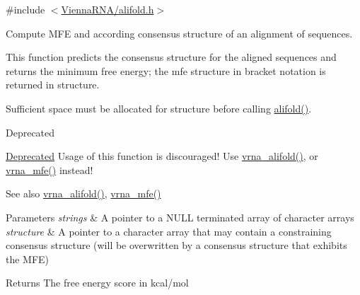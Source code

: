 {\ttfamily \#include $<$\mbox{\hyperlink{alifold_8h}{Vienna\+R\+N\+A/alifold.\+h}}$>$}



Compute M\+FE and according consensus structure of an alignment of sequences. 

This function predicts the consensus structure for the aligned \textquotesingle{}sequences\textquotesingle{} and returns the minimum free energy; the mfe structure in bracket notation is returned in \textquotesingle{}structure\textquotesingle{}.

Sufficient space must be allocated for \textquotesingle{}structure\textquotesingle{} before calling \mbox{\hyperlink{group__mfe__global__deprecated_ga4cf00f0659e5f0480335d69e797f05b1}{alifold()}}.

\begin{DoxyRefDesc}{Deprecated}
\item[\mbox{\hyperlink{deprecated__deprecated000012}{Deprecated}}]Usage of this function is discouraged! Use \mbox{\hyperlink{group__mfe__global_ga6c9d3bef3e92c6d423ffac9f981418c1}{vrna\+\_\+alifold()}}, or \mbox{\hyperlink{group__mfe__global_gabd3b147371ccf25c577f88bbbaf159fd}{vrna\+\_\+mfe()}} instead! \end{DoxyRefDesc}
\begin{DoxySeeAlso}{See also}
\mbox{\hyperlink{group__mfe__global_ga6c9d3bef3e92c6d423ffac9f981418c1}{vrna\+\_\+alifold()}}, \mbox{\hyperlink{group__mfe__global_gabd3b147371ccf25c577f88bbbaf159fd}{vrna\+\_\+mfe()}}
\end{DoxySeeAlso}

\begin{DoxyParams}{Parameters}
{\em strings} & A pointer to a N\+U\+LL terminated array of character arrays \\
\hline
{\em structure} & A pointer to a character array that may contain a constraining consensus structure (will be overwritten by a consensus structure that exhibits the M\+FE) \\
\hline
\end{DoxyParams}
\begin{DoxyReturn}{Returns}
The free energy score in kcal/mol 
\end{DoxyReturn}
\mbox{\label{group__mfe__global__deprecated_gabc8517f22cfe70595ee81fc837910d52}} 
